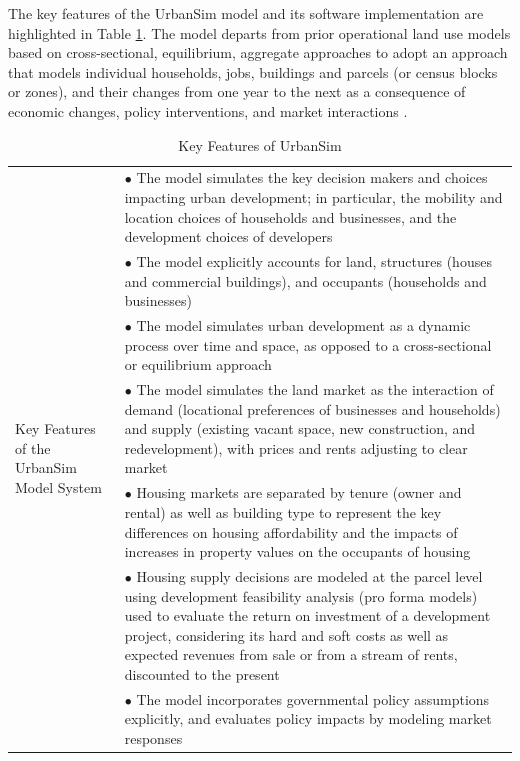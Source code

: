 \bigskip
The key features of the UrbanSim model and its software implementation are highlighted in Table \ref{tab:key-features}.  The model departs from prior operational land use models based on cross-sectional, equilibrium, aggregate approaches to adopt an approach that models individual households, jobs, buildings and parcels (or census blocks or zones), and their changes from one year to the next as a consequence of economic changes, policy interventions, and market interactions .

\begin{table}[htp]
\caption{Key Features of UrbanSim}
\label{tab:key-features}
\begin{center}
\begin{tabular}{ p{1.5in}  p{4.4in}  }
\toprule[1.5pt]
\multirow[c]{10}{1.5in}{Key Features of the UrbanSim
Model System} &  $\bullet$   The model simulates the key decision makers and
choices impacting urban development; in particular, the mobility and
location choices of households and businesses, and the development
choices of developers\\
&  $\bullet$   The model explicitly accounts for land, structures (houses and commercial buildings), and occupants (households and businesses)\\
&  $\bullet$   The model simulates urban development as a dynamic process over time and space, as opposed to a cross-sectional or equilibrium approach\\
&  $\bullet$   The model simulates the land market as the interaction of demand (locational preferences of businesses and households) and supply (existing vacant space, new construction, and redevelopment), with prices and rents adjusting to clear market\\
&  $\bullet$   Housing markets are separated by tenure (owner and rental) as well as building type to represent the key differences on housing affordability and the impacts of increases in property values on the occupants of housing\\
&  $\bullet$   Housing supply decisions are modeled at the parcel level using development feasibility analysis (pro forma models) used to evaluate the return on investment of a development project, considering its hard and soft costs as well as expected revenues from sale or from a stream of rents, discounted to the present\\
& $\bullet$    The model incorporates governmental policy assumptions explicitly, and evaluates policy impacts by modeling market responses\\

\end{tabular}
\end{center}
\end{table}
